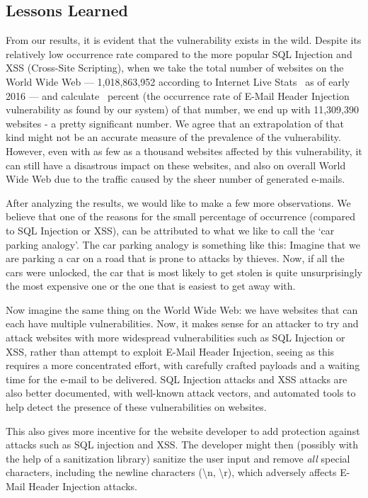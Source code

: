 \subsection{Lessons Learned}
    From our results, it is evident that the vulnerability exists in the wild. Despite its relatively low occurrence rate compared to the more popular SQL Injection and XSS (Cross-Site Scripting), when we take the total number of websites on the World Wide Web --- 1,018,863,952 according to Internet Live Stats~\cite{InternetLiveStats2016} as of early 2016 --- and calculate \successDelta\ percent (the occurrence rate of E-Mail Header Injection vulnerability as found by our system) of that number, we end up with 11,309,390 websites - a pretty significant number. We agree that an extrapolation of that kind might not be an accurate measure of the prevalence of the vulnerability. However, even with as few as a thousand websites affected by this vulnerability, it can still have a disastrous impact on these websites, and also on overall World Wide Web due to the traffic caused by the sheer number of generated e-mails. 
    
    After analyzing the results, we would like to make a few more observations. We believe that one of the reasons for the small percentage of occurrence (compared to SQL Injection or XSS), can be attributed to what we like to call the `car parking analogy'.
    The car parking analogy is something like this: Imagine that we are parking a car on a road that is prone to attacks by thieves. Now, if all the cars were unlocked, the car that is most likely to get stolen is quite unsurprisingly the most expensive one or the one that is easiest to get away with.
    
    Now imagine the same thing on the World Wide Web: we have websites that can each have multiple vulnerabilities. Now, it makes sense for an attacker to try and attack websites with more widespread vulnerabilities such as SQL Injection or XSS, rather than attempt to exploit E-Mail Header Injection, seeing as this requires a more concentrated effort, with carefully crafted payloads and a waiting time for the e-mail to be delivered. SQL Injection attacks and XSS attacks are also better documented, with well-known attack vectors, and automated tools to help detect the presence of these vulnerabilities on websites.
    
    This also gives more incentive for the website developer to add protection against attacks such as SQL injection and XSS. The developer might then (possibly with the help of a sanitization library) sanitize the user input and remove \emph{all} special characters, including the newline characters (\textbackslash{}n, \textbackslash{}r), which adversely affects E-Mail Header Injection attacks.

